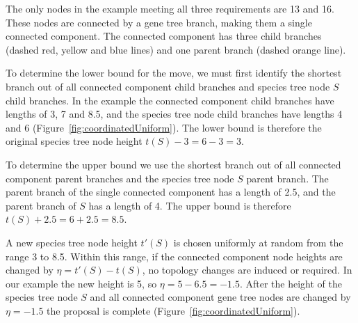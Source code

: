 \documentclass[12pt]{article}
\begin{document}
The only nodes in the example meeting all three requirements are 13 and 16.
These nodes are connected by a gene tree branch, making them a single
connected component. The connected component has three child branches (dashed
red, yellow and blue lines) and one parent branch (dashed orange line).

To determine the lower bound for the move, we must first identify the shortest
branch out of all connected component child branches and species tree node $S$
child branches. In the example the connected component child branches have
lengths of 3, 7 and 8.5, and the species tree node child branches have lengths 4
and 6 (Figure~\ref{fig:coordinatedUniform}). The lower bound is therefore the
original species tree node height $t(S) - 3 = 6 - 3 = 3$.

To determine the upper bound we use the shortest branch out of all connected
component parent branches and the species tree node $S$ parent branch. The
parent branch of the single connected component has a length of 2.5, and
the parent branch of $S$ has a length of 4. The upper bound is therefore
$t(S) + 2.5 = 6 + 2.5 = 8.5$.

A new species tree node height $t'(S)$ is chosen uniformly at random from the
range 3 to 8.5. Within this range, if the connected component node heights are
changed by $\eta = t'(S) - t(S)$, no topology changes are induced or required. In our
example the new height is 5, so $\eta = 5 - 6.5 = -1.5$. After the height of
the species tree node $S$ and all connected component gene tree nodes are
changed by $\eta = -1.5$ the proposal is complete
(Figure~\ref{fig:coordinatedUniform}).
\end{document}
